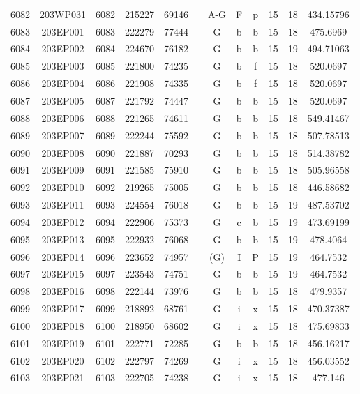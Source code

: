 \begin{tabular}{|*{12}{c|}}
6082 & 203WP031 & 6082 & 215227 & 69146 &  & A-G & F & p & 15 & 18 & 434.15796 \\ 
6083 & 203EP001 & 6083 & 222279 & 77444 &  & G & b & b & 15 & 18 & 475.6969 \\ 
6084 & 203EP002 & 6084 & 224670 & 76182 &  & G & b & b & 15 & 19 & 494.71063 \\ 
6085 & 203EP003 & 6085 & 221800 & 74235 &  & G & b & f & 15 & 18 & 520.0697 \\ 
6086 & 203EP004 & 6086 & 221908 & 74335 &  & G & b & f & 15 & 18 & 520.0697 \\ 
6087 & 203EP005 & 6087 & 221792 & 74447 &  & G & b & b & 15 & 18 & 520.0697 \\ 
6088 & 203EP006 & 6088 & 221265 & 74611 &  & G & b & b & 15 & 18 & 549.41467 \\ 
6089 & 203EP007 & 6089 & 222244 & 75592 &  & G & b & b & 15 & 18 & 507.78513 \\ 
6090 & 203EP008 & 6090 & 221887 & 70293 &  & G & b & b & 15 & 18 & 514.38782 \\ 
6091 & 203EP009 & 6091 & 221585 & 75910 &  & G & b & b & 15 & 18 & 505.96558 \\ 
6092 & 203EP010 & 6092 & 219265 & 75005 &  & G & b & b & 15 & 18 & 446.58682 \\ 
6093 & 203EP011 & 6093 & 224554 & 76018 &  & G & b & b & 15 & 19 & 487.53702 \\ 
6094 & 203EP012 & 6094 & 222906 & 75373 &  & G & c & b & 15 & 19 & 473.69199 \\ 
6095 & 203EP013 & 6095 & 222932 & 76068 &  & G & b & b & 15 & 19 & 478.4064 \\ 
6096 & 203EP014 & 6096 & 223652 & 74957 &  & (G) & I & P & 15 & 19 & 464.7532 \\ 
6097 & 203EP015 & 6097 & 223543 & 74751 &  & G & b & b & 15 & 19 & 464.7532 \\ 
6098 & 203EP016 & 6098 & 222144 & 73976 &  & G & b & b & 15 & 18 & 479.9357 \\ 
6099 & 203EP017 & 6099 & 218892 & 68761 &  & G & i & x & 15 & 18 & 470.37387 \\ 
6100 & 203EP018 & 6100 & 218950 & 68602 &  & G & i & x & 15 & 18 & 475.69833 \\ 
6101 & 203EP019 & 6101 & 222771 & 72285 &  & G & b & b & 15 & 18 & 456.16217 \\ 
6102 & 203EP020 & 6102 & 222797 & 74269 &  & G & i & x & 15 & 18 & 456.03552 \\ 
6103 & 203EP021 & 6103 & 222705 & 74238 &  & G & i & x & 15 & 18 & 477.146 \\ 

\end{tabular}
